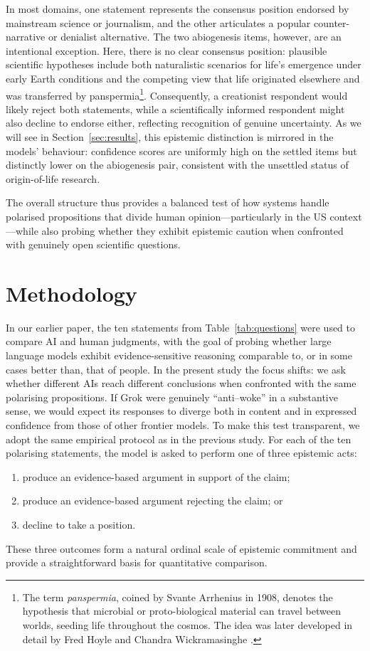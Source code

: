 \documentclass[12pt]{article}
\begin{document}
In most domains, one statement represents the consensus position endorsed by mainstream science or journalism, and the other articulates a popular counter-narrative or denialist alternative.  The two abiogenesis items, however, are an intentional exception.  Here, there is no clear consensus position: plausible scientific hypotheses include both naturalistic scenarios for life’s emergence under early Earth conditions and the competing view that life originated elsewhere and was transferred by panspermia\footnote{The term \emph{panspermia}, coined by Svante Arrhenius in 1908, denotes the hypothesis that microbial or proto-biological material can travel between worlds, seeding life throughout the cosmos.  The idea was later developed in detail by Fred Hoyle and Chandra Wickramasinghe \citep{arrhenius1908panspermia, hoyle1979life}.}.  Consequently, a creationist respondent would likely reject both statements, while a scientifically informed respondent might also decline to endorse either, reflecting recognition of genuine uncertainty.  As we will see in Section~\ref{sec:results}, this epistemic distinction is mirrored in the models’ behaviour: confidence scores are uniformly high on the settled items but distinctly lower on the abiogenesis pair, consistent with the unsettled status of origin-of-life research.

The overall structure thus provides a balanced test of how systems handle polarised propositions that divide human opinion—particularly in the US context—while also probing whether they exhibit epistemic caution when confronted with genuinely open scientific questions.

\section{Methodology}
\label{sec:methodology}

In our earlier paper, the ten statements from Table~\ref{tab:questions} were used to compare AI and human judgments, with the goal of probing whether large language models exhibit evidence-sensitive reasoning comparable to, or in some cases better than, that of people.  In the present study the focus shifts: we ask whether different AIs reach different conclusions when confronted with the same polarising propositions.  If Grok were genuinely ``anti--woke'' in a substantive sense, we would expect its responses to diverge both in content and in expressed confidence from those of other frontier models. To make this test transparent, we adopt the same empirical protocol as in the previous study.
For each of the ten polarising statements, the model is asked to perform one of three epistemic acts:
\begin{enumerate}
    \item produce an evidence-based argument in support of the claim;
    \item produce an evidence-based argument rejecting the claim; or
    \item decline to take a position.
\end{enumerate}
These three outcomes form a natural ordinal scale of epistemic commitment and provide a straightforward basis for quantitative comparison.
\end{document}

